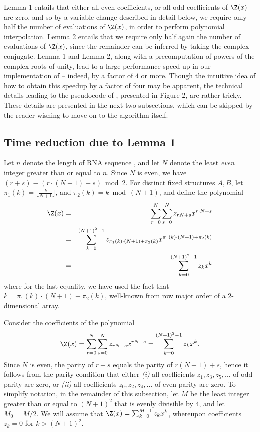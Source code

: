 Lemma 1 entails that either all even coefficients, or all odd coefficients
of $\Z(x)$ are zero, and so by a variable change described in detail below,
we require only half the number of evaluations of $\Z(x)$, in order to perform
polynomial interpolation.
Lemma 2 entails that we require only half again the number of evaluations of
$\Z(x)$, since the remainder can be inferred by taking the complex conjugate.
Lemma 1 and Lemma 2, along with a
precomputation of powers of the complex roots of unity, lead to a
large performance speed-up in our implementation of \ffttwo -- indeed,
by a factor of $4$ or more. Though the intuitive idea of how to obtain
this speedup by a factor of four may be apparent, the technical details
leading to the pseudocode of \ffttwo, presented in
Figure 2, are rather tricky. These details
are presented in the next two subsections, which can be skipped by the
reader wishing to move on to the algorithm itself.
\medskip

\subsection{Time reduction due to Lemma 1}
Let $n$ denote the length of RNA sequence \seq, and let $N$ denote the
least {\em even} integer greater than or equal to $n$. Since $N$ is even,
we have $(r+s) \equiv (r\cdot(N+1)+s) \bmod 2$. For distinct
fixed structures $A,B$, let
$\pi_1(k) = \lfloor \frac{k}{N+1} \rfloor$, and
$\pi_2(k) = k \bmod (N+1)$, and define the polynomial
\begin{eqnarray*}
\label{eq:polynomialPeter}
\Z(x) &=& \sum_{r=0}^{N} \sum_{s=0}^{N} z_{rN+s} x^{r\cdot N + s}\\
&=&
\sum_{k=0}^{(N+1)^2-1} z_{\pi_1(k)\cdot (N+1) + \pi_2(k)}
x^{\pi_1(k)\cdot (N+1) + \pi_2(k)}\\
&=&
\sum_{k=0}^{(N+1)^2-1} z_k x^k
\end{eqnarray*}
where for the last equality, we have used the fact that
$k = \pi_1(k)\cdot (N+1) + \pi_2(k)$, well-known from
row major order of a 2-dimensional array.

Consider the coefficients of the polynomial
\begin{eqnarray}
\label{eq:yannPolynomialN}
\Z(x) = \sum_{r=0}^{N} \sum_{s=0}^{N} z_{rN+s} x^{rN+s}
= \sum_{k=0}^{(N+1)^2-1} z_k x^k.
\end{eqnarray}
Since $N$ is even, the parity of $r+s$ equals the parity of
$r(N+1)+s$, hence  it follows from the parity condition that either
{\em (i)} all coefficients $z_1,z_3,z_5,\ldots$ of odd parity are zero,
or {\em (ii)} all coefficients $z_0,z_2,z_4,\ldots$ of even parity are zero.
To simplify notation, in the remainder of this subsection, let $M$ be
the least integer greater than or equal to $(N+1)^2$ that is evenly divisible
by $4$, and let $M_0=M/2$. We will assume that $\Z(x) = \sum_{k=0}^{M-1}
z_k x^k$, whereupon coefficients $z_k=0$ for $k>(N+1)^2$.
\smallskip

